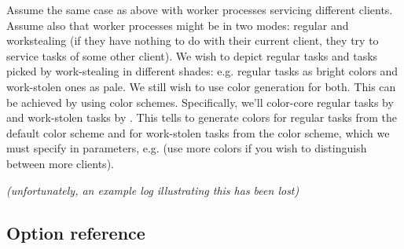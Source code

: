 \documentclass{article}
\begin{document}
Assume the same case as above with worker processes servicing different clients. Assume also that worker processes might be in two modes: regular and workstealing (if they have nothing to do with their current client, they try to service tasks of some other client). We wish to depict regular tasks and tasks picked by work-stealing in different shades: e.g. regular tasks as bright colors and work-stolen ones as pale. We still wish to use color generation for both. This can be achieved by using color schemes. Specifically, we'll color-core regular tasks by  and work-stolen tasks by . This tells \splot{} to generate colors for regular tasks from the default color scheme and for work-stolen tasks from the  color scheme, which we must specify in  parameters, e.g.  (use more colors if you wish to distinguish between more clients).

\emph{(unfortunately, an example log illustrating this has been lost)}

\subsection{Option reference}
\end{document}
